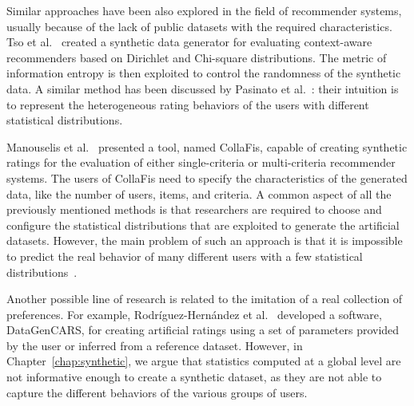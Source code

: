 Similar approaches have been also explored in the field of recommender systems, usually because of the lack of public datasets with the required characteristics. Tso et al.~\cite{Tso2006} created a synthetic data generator for evaluating context-aware recommenders based on Dirichlet and Chi-square distributions. The metric of information entropy is then exploited to control the randomness of the synthetic data. A similar method has been discussed by Pasinato et al.~\cite{Pasinato2013}: their intuition is to represent the heterogeneous rating behaviors of the users with different statistical distributions.

Manouselis et al.~\cite{Manouselis2008} presented a tool, named CollaFis, capable of creating synthetic ratings for the evaluation of either single-criteria or multi-criteria recommender systems. The users of CollaFis need to specify the characteristics of the generated data, like the number of users, items, and criteria. A common aspect of all the previously mentioned methods is that researchers are required to choose and configure the statistical distributions that are exploited to generate the artificial datasets. However, the main problem of such an approach is that it is impossible to predict the real behavior of many different users with a few statistical distributions~\cite{Montaner2004}.

Another possible line of research is related to the imitation of a real collection of preferences. For example, Rodr{\'i}guez-Hern{\'a}ndez et al.~\cite{CarmenRodriguez-Hernandez2017} developed a software, DataGenCARS, for creating artificial ratings using a set of parameters provided by the user or inferred from a reference dataset. However, in Chapter~\ref{chap:synthetic}, we argue that statistics computed at a global level are not informative enough to create a synthetic dataset, as they are not able to capture the different behaviors of the various groups of users.
